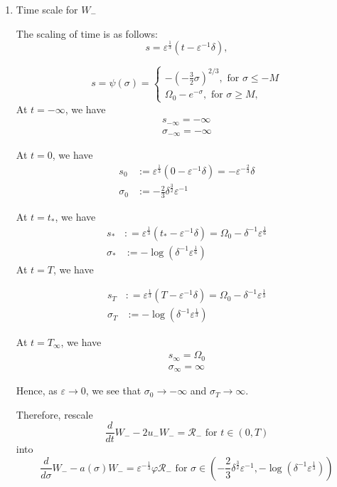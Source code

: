 \documentclass[letterpaper,11pt]{article}
\newcommand{\eps}{\varepsilon}
\numberwithin{equation}{section}
\theoremstyle{plain}
\begin{document}
\begin{enumerate}

\item Time scale for $W_-$

The scaling of time is as follows:
\[
s = \eps^{\frac{1}{3}}(t-\eps^{-1}\delta),
\]

\[
s=\psi(\sigma) =\begin{cases}
-(-\frac{3}{2} \sigma)^{2/3} , \text{ for }\sigma \le -M\\
\Omega_0 -e^{-\sigma}, \text{ for }\sigma \ge M,
\end{cases}
\]
At $t = -\infty$, we have
\begin{align*}
s_{-\infty} = -\infty\\
\sigma_{-\infty} = -\infty
\end{align*}

At $t = 0$, we have
\begin{align*}
s_0 &:= \eps^{\frac{1}{3}}(0-\eps^{-1}\delta) = -\eps^{-\frac{2}{3}}\delta \\
\sigma_0 &:= -\frac{2}{3} \delta^{\frac{3}{2}} \eps^{-1}
\end{align*}

At $t = t_*$, we have 
\begin{align*}
s_* &: = \eps^{\frac{1}{3}}(t_* - \eps^{-1}\delta) = \Omega_0 - \delta^{-1}\eps^{\frac{1}{6}} \\
\sigma_* &:= -\log(\delta^{-1}\eps^{\frac{1}{6}})  
\end{align*}
At $t = T$, we have

\begin{align*}
s_T &: = \eps^{\frac{1}{3}}(T-\eps^{-1}\delta) = \Omega_0 - \delta^{-1}\eps^{\frac{1}{3}} \\
\sigma_T &:= -\log(\delta^{-1}\eps^{\frac{1}{3}})
\end{align*}

At $t = T_\infty$, we have
\begin{align*}
s_\infty = \Omega_0\\
\sigma_\infty = \infty
\end{align*}

Hence, as $\eps \to 0$, we see that $\sigma_0 \to -\infty$ and $\sigma_T \to \infty$.

Therefore, rescale 
\[
\frac{d}{dt}W_- -2u_-W_-=\mathcal{R}_- \text{ for }t \in (0,T)
\] into
\[
\frac{d}{d\sigma} W_- -a(\sigma)W_- = \eps^{-\frac{1}{3}}\varphi \mathcal{R}_- \text{ for }\sigma \in \left( -\frac{2}{3}\delta^{\frac{3}{2}}\eps^{-1}  , -\log(\delta^{-1}\eps^{\frac{1}{3}}) \right)
\]


\end{enumerate}
\end{document}
